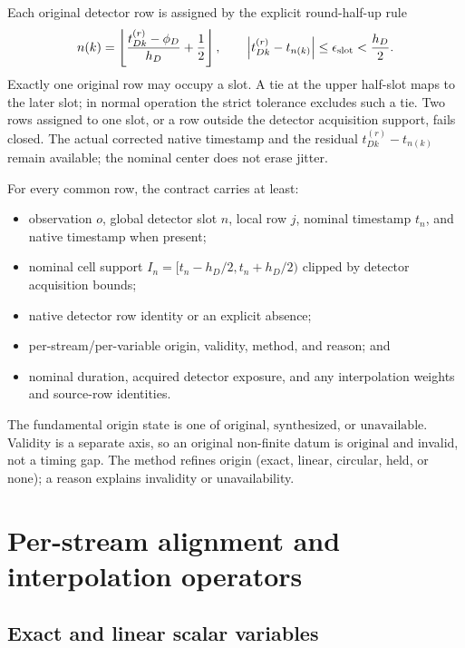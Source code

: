 \documentclass[11pt]{article}
\newcommand{\state}[1]{\mathrm{#1}}
\begin{document}
Each original detector row is assigned by the explicit round-half-up rule
\begin{equation}
 n(k)=\left\lfloor
 \frac{t_{Dk}^{(r)}-\phi_D}{h_D}+\frac12
 \right\rfloor,\qquad
 \left|t_{Dk}^{(r)}-t_{n(k)}\right|\leq\epsilon_{\rm slot}<\frac{h_D}{2}.
 \label{eq:slot}
\end{equation}
Exactly one original row may occupy a slot.  A tie at the upper half-slot
maps to the later slot; in normal operation the strict tolerance excludes
such a tie.  Two rows assigned to one slot, or a row outside the detector
acquisition support, fails closed.  The actual corrected native timestamp and
the residual \(t_{Dk}^{(r)}-t_{n(k)}\) remain available; the nominal center
does not erase jitter.

For every common row, the contract carries at least:

\begin{itemize}[nosep]
\item observation \(o\), global detector slot \(n\), local row \(j\), nominal
timestamp \(t_n\), and native timestamp when present;
\item nominal cell support
\(I_n=[t_n-h_D/2,t_n+h_D/2)\) clipped by detector acquisition bounds;
\item native detector row identity or an explicit absence;
\item per-stream/per-variable origin, validity, method, and reason; and
\item nominal duration, acquired detector exposure, and any interpolation
weights and source-row identities.
\end{itemize}

The fundamental origin state is one of \(\state{original}\),
\(\state{synthesized}\), or \(\state{unavailable}\).  Validity is a separate
axis, so an original non-finite datum is \(\state{original}\) and invalid, not
a timing gap.  The method refines origin (exact, linear, circular, held, or
none); a reason explains invalidity or unavailability.

\section{Per-stream alignment and interpolation operators}

\subsection{Exact and linear scalar variables}
\end{document}
